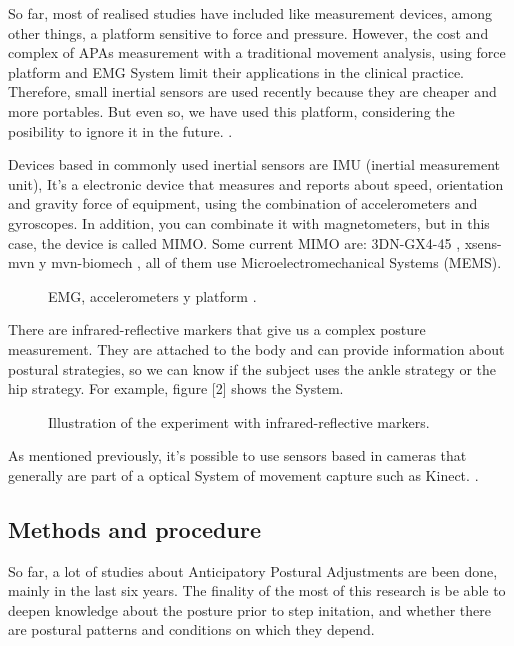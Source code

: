So far, most of realised studies have included like measurement devices, among other things, a platform sensitive to force and pressure. However, the cost and complex of APAs measurement with a traditional movement analysis, using force platform and EMG System limit their applications in the  clinical practice. Therefore, small inertial sensors are used recently because they are cheaper and more portables. But even so, we have used this platform, considering the posibility to ignore it in the future. \cite{Mancini2009} \cite{Vennila2011}.

Devices based in commonly used inertial sensors are IMU (inertial measurement unit), It’s a electronic device that measures and reports about speed, orientation and gravity force of equipment, using the combination of accelerometers and gyroscopes.
In addition, you can combinate it with magnetometers, but in this case, the device is called MIMO. Some current MIMO are: 3DN-GX4-45 \cite{Instr2},  xsens-mvn \cite{Instr3} y mvn-biomech \cite{Instr4}, all of them use Microelectromechanical Systems (MEMS).

\begin{figure}[H]
	\centering
	\caption{EMG, accelerometers y platform \cite{Gay2011}.}
	\label{fig:arte1}
\end{figure}

There are  infrared-reflective markers that give us a complex posture measurement. They are attached  to the body and can provide information about postural strategies, so we can know if the subject uses the ankle strategy or the hip strategy. For example, figure [2] shows the System.

\begin{figure}[H]
	\centering
	\caption{Illustration of the experiment with infrared-reflective markers\cite{Teddy2013}.}
	\label{fig:arte2}
\end{figure}

As mentioned previously, it's possible to use sensors based in cameras that generally are part of a optical System of movement capture such  as Kinect. \cite{Instr5}.


\subsection{Methods and procedure}

So far, a lot of studies about Anticipatory Postural Adjustments are been done, mainly in the  last six years. The finality of the most of this research is be able to deepen knowledge about the posture prior to step initation, and whether there are postural patterns and conditions on which they depend.

